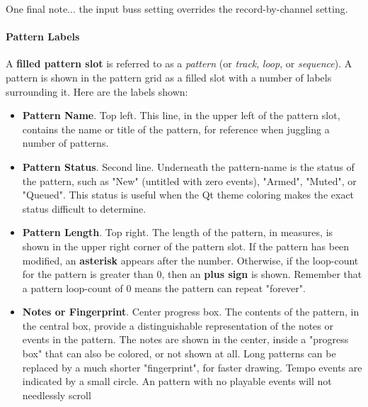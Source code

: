    One final note... the input buss setting overrides the record-by-channel
   setting.

\paragraph{Pattern Labels}
\label{paragraph:patterns_labels}
   
   A \textbf{filled pattern slot} is referred to as a \textsl{pattern}
   (or \textsl{track}, \textsl{loop}, or \textsl{sequence}).
   A pattern is shown in the pattern grid as a filled slot with a number of
   labels surrounding it.  Here are the labels shown:

   \begin{itemize}
      \item \textbf{Pattern Name}. Top left.
         This line, in the upper left of the pattern slot, contains the name or
         title of the pattern, for reference when juggling a number of
         patterns.
      \item \textbf{Pattern Status}. Second line.
         Underneath the pattern-name is the status of the pattern, such as
         "New" (untitled with zero events), "Armed", "Muted", or "Queued".
         This status is useful when the Qt theme coloring makes the exact
         status difficult to determine.
      \item \textbf{Pattern Length}. Top right.
         The length of the pattern, in measures, is shown in the upper
         right corner of the pattern slot.
         If the pattern has been modified, an \textbf{asterisk}
         appears after the
         number.
         Otherwise, if the loop-count for the pattern is greater than 0, 
         then an \textbf{plus sign} is shown.
         Remember that a pattern loop-count of 0 means the pattern can repeat
         "forever".
      \item \textbf{Notes or Fingerprint}. Center progress box.
         The contents of the pattern, in the central box,
         provide a distinguishable representation of the notes or events in the
         pattern.
         The notes are shown in the center, inside a "progress box" that
         can also be colored, or not shown at all.
         Long patterns can be replaced by a much shorter "fingerprint", for
         faster drawing.
         Tempo events are indicated by a small circle.
         An pattern with no playable events will not needlessly scroll

\end{itemize}
